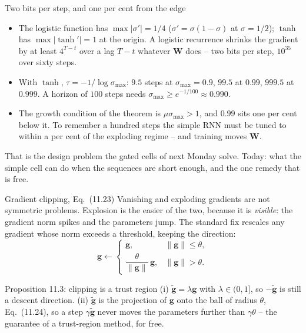 \documentclass[10pt,aspectratio=169]{beamer}
\begin{document}
\begin{frame}{Two bits per step, and one per cent from the edge}
\begin{itemize}
  \item The logistic function has $\max|\sigma'|=1/4$ ($\sigma'=\sigma(1-\sigma)$
        at $\sigma=1/2$); $\tanh$ has $\max|\tanh'|=1$ at the origin.  A
        logistic recurrence shrinks the gradient by at least $4^{T-t}$ over a
        lag $T-t$ whatever $\bm{W}$ does -- two bits per step, $10^{35}$ over
        sixty steps.
  \item With $\tanh$, $\tau=-1/\log\sigma_{\max}$: $9.5$ steps at
        $\sigma_{\max}=0.9$, $99.5$ at $0.99$, $999.5$ at $0.999$.  A
        horizon of $100$ steps needs $\sigma_{\max}\ge e^{-1/100}\approx0.990$.
  \item The growth condition of the theorem is $\mu\sigma_{\max}>1$, and
        $0.99$ sits one per cent below it.  To remember a hundred steps the
        simple RNN must be tuned to within a per cent of the exploding
        regime -- and training moves $\bm{W}$.
\end{itemize}
\medskip
That is the design problem the gated cells of next Monday solve.  Today:
what the simple cell can do when the sequences are short enough, and the
one remedy that is free.
\end{frame}


\begin{frame}{Gradient clipping, Eq.~(11.23)}
Vanishing and exploding gradients are not symmetric problems.  Explosion is
the easier of the two, because it is \emph{visible}: the gradient norm
spikes and the parameters jump.  The standard fix rescales any gradient
whose norm exceeds a threshold, keeping the direction:
\[
  \bm{g}\longleftarrow
  \begin{cases}
    \bm{g}, & \|\bm{g}\|\le\theta,\\[2pt]
    \dfrac{\theta}{\|\bm{g}\|}\,\bm{g}, & \|\bm{g}\|>\theta.
  \end{cases}
\]
\begin{block}{Proposition 11.3: clipping is a trust region}
(i) $\tilde{\bm{g}}=\lambda\bm{g}$ with $\lambda\in(0,1]$, so
$-\tilde{\bm{g}}$ is still a descent direction.  (ii) $\tilde{\bm{g}}$ is
the projection of $\bm{g}$ onto the ball of radius $\theta$, Eq.~(11.24),
so a step $\gamma\tilde{\bm{g}}$ never moves the parameters further than
$\gamma\theta$ -- the guarantee of a trust-region method, for free.
\end{block}
\end{frame}
\end{document}

